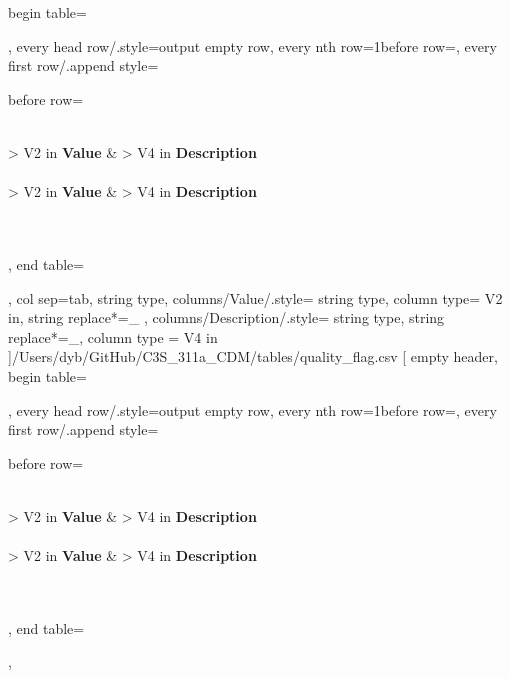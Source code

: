 \documentclass[a4paper]{article}
\begin{document}
    begin table=\begin{longtable},
    every head row/.style={output empty row},
    every nth row={1}{before row=\hline},
    every first row/.append style={
        before row={%
            \caption{Quality flag}
            \label{tab:DataTable}\\
            \hline\hline {} { > {\centering}V{2 in}} { \textbf{Value}} &  { > {\centering} V{4 in} } {\textbf{Description}} \\ \hline\hline \endfirsthead
             \\
            \hline\hline {} { > {\centering}V{2 in} } { \textbf{Value}} &  { > {\centering} V{4 in} } {\textbf{Description}} \\ \hline\hline \endhead
             \\
            \endfoot
            \hline
             \\ 
            \endlastfoot
        }
    },
    end table=\end{longtable},
    col sep=tab,
    string type,
    columns/Value/.style={
            string type, 
            column type= V{2 in}, 
            string replace*={_}{}
        },
    columns/Description/.style={
            string type, 
            string replace*={_}{},
            column type = V{4 in}
        }
    ]{/Users/dyb/GitHub/C3S_311a_CDM/tables/quality_flag.csv}
\pgfplotstabletypeset[
    empty header,
    begin table=\begin{longtable},
    every head row/.style={output empty row},
    every nth row={1}{before row=\hline},
    every first row/.append style={
        before row={%
            \caption{Report processing code}
            \label{tab:DataTable}\\
            \hline\hline {} { > {\centering}V{2 in}} { \textbf{Value}} &  { > {\centering} V{4 in} } {\textbf{Description}} \\ \hline\hline \endfirsthead
             \\
            \hline\hline {} { > {\centering}V{2 in} } { \textbf{Value}} &  { > {\centering} V{4 in} } {\textbf{Description}} \\ \hline\hline \endhead
             \\
            \endfoot
            \hline
             \\ 
            \endlastfoot
        }
    },
    end table=\end{longtable},
\end{document}
